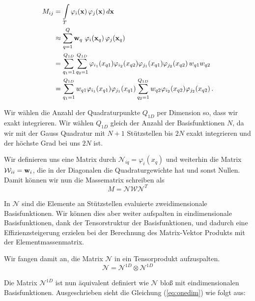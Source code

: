 \begin{equation} \label{eq:massapprox}
\begin{aligned}
M_{ij} &= \int\limits_{T} \varphi_i (\bold{x}) \, \varphi_j (\bold{x}) \, d\bold{x} \\
&\approx  \sum\limits_{q=1}^Q \bold{w}_q \, \, \varphi_i (\bold{x}_q) \, \varphi_j (\bold{x}_q) \\
&= \sum\limits_{q_1=1}^{Q_{1D}} \sum\limits_{q_2=1}^{Q_{1D}} \varphi_{i_1}(x_{q1}) \varphi_{i_2}(x_{q2}) \varphi_{j_1}(x_{q1}) \varphi_{j_2}(x_{q2}) \, w_{q1} w_{q2} \\ 
&= \sum\limits_{q_1=1}^{Q_{1D}} w_{q1} \varphi_{i_1}(x_{q1}) \varphi_{j_1}(x_{q1}) \sum\limits_{q_2=1}^{Q_{1D}} w_{q2} \varphi_{i_2}(x_{q2}) \varphi_{j_2}(x_{q2}) \, . 
\end{aligned}
\end{equation}

Wir wählen die Anzahl der Quadraturpunkte $Q_{1D}$ per Dimension so, dass wir exakt integrieren. Wir wählen $Q_{1D}$ gleich der Anzahl der Basisfunktionen $N$, da wir mit der Gauss Quadratur mit $N+1$ Stützstellen bis $2N$ exakt integrieren und der höchste Grad bei uns $2N$ ist.

Wir definieren uns eine Matrix durch $\mathcal{N}_{iq}=\varphi_i(x_q)$ und weiterhin die Matrix $\mathcal{W}_{ii}=\bold{w}_i$, die in der Diagonalen die Quadraturgewichte hat und sonst Nullen. Damit können wir nun die Massematrix schreiben als
\begin{equation}
M = \mathcal{N} \mathcal{W} \mathcal{N}^T
\end{equation}

In $\mathcal{N}$ sind die Elemente an Stützstellen evaluierte zweidimensionale Basisfunktionen. Wir können dies aber weiter aufspalten in eindimensionale Basisfunktionen, dank der Tensorstruktur der Basisfunktionen, und dadurch eine Effizienzsteigerung erzielen bei der Berechnung des Matrix-Vektor Produkts mit der Elementmassenmatrix.

Wir fangen damit an, die Matrix $\mathcal{N}$ in ein Tensorprodukt aufzuspalten. 
\begin{equation} \label{eq:onedim}
\mathcal{N} = \mathcal{N}^{1D} \otimes \mathcal{N}^{1D}
\end{equation}

Die Matrix $\mathcal{N}^{1D}$ ist nun äquivalent definiert wie $\mathcal{N}$ bloß mit eindimensionalen Basisfunktionen. Ausgeschrieben sieht die Gleichung (\ref{eq:onedim}) wie folgt aus:

